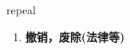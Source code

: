 
\begin{frame}
{\huge repeal}
\begin{center}
\begin{enumerate}\Large
  \item \textbf{撤销，废除(法律等)}
\end{enumerate}
\end{center}
\end{frame}
